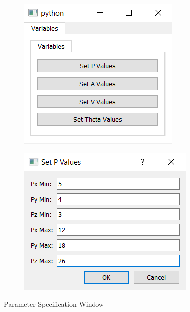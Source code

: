 \documentclass[12pt]{article}
\numberwithin{equation}{section}
\begin{document}
\begin{itemize}
\begin{figure}[H]
\begin{subfigure}{0.45\textwidth}
      \includegraphics[width=\textwidth]{Figures/AllParam.png}
    \end{subfigure}
    \begin{subfigure}{0.45\textwidth}
      \centering
      \includegraphics[width=\textwidth]{Figures/OneParam.png}
    \end{subfigure}
    \caption{Parameter Specification Window}
  \end{figure}

\end{itemize}
\end{document}
